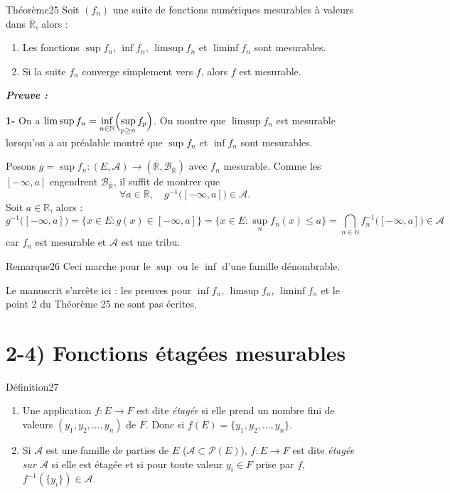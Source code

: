 \documentclass[11pt,a4paper]{article}
\newcommand{\R}{\mathbb{R}}
\newcommand{\N}{\mathbb{N}}
\newcommand{\Rb}{\overline{\mathbb{R}}}
\newcommand{\A}{\mathscr{A}}
\newcommand{\B}{\mathscr{B}}
\newcommand{\Pp}{\mathscr{P}}
\newenvironment{preuve}{\par\textit{\textbf{Preuve :}}\par\nopagebreak[4]}{\par}
\begin{document}
\begin{enonce}{Théorème}{25}
Soit $(f_n)$ une suite de fonctions numériques mesurables à valeurs dans $\Rb$, alors :
\begin{enumerate}[label=\textbf{\arabic*-},leftmargin=1.2cm]
  \item Les fonctions $\sup f_n$, $\inf f_n$, $\limsup f_n$ et $\liminf f_n$ sont mesurables.
  \item Si la suite $f_n$ converge simplement vers $f$, alors $f$ est mesurable.
\end{enumerate}
\end{enonce}

\begin{preuve}\end{preuve}

\textbf{1-} On a $\displaystyle\limsup f_n=\inf_{n\in\N}\Bigl(\sup_{p\ge n}f_p\Bigr)$.
On montre que $\limsup f_n$ est mesurable lorsqu'on a au préalable montré que
$\sup f_n$ et $\inf f_n$ sont mesurables.

Posons $g=\sup f_n : (E,\A)\to(\Rb,\B_{\Rb})$ avec $f_n$ mesurable.
Comme les $[-\infty,a]$ engendrent $\B_{\Rb}$, il suffit de montrer que
\[
  \forall a\in\R,\quad g^{-1}\bigl([-\infty,a]\bigr)\in\A .
\]
Soit $a\in\R$, alors :
\[
  g^{-1}\bigl([-\infty,a]\bigr)=\bigl\{x\in E : g(x)\in[-\infty,a]\bigr\}
  =\bigl\{x\in E : \sup_n f_n(x)\le a\bigr\}
  =\bigcap_{n\in\N} f_n^{-1}\bigl([-\infty,a]\bigr)\in\A
\]
car $f_n$ est mesurable et $\A$ est une tribu.

\begin{enonce}{Remarque}{26}
Ceci marche pour le $\sup$ ou le $\inf$ d'une famille dénombrable.
\end{enonce}

\begin{note}
Le manuscrit s'arrête ici : les preuves pour $\inf f_n$, $\limsup f_n$, $\liminf f_n$
et le point 2 du Théorème 25 ne sont pas écrites.
\end{note}

\section*{2-4) Fonctions étagées mesurables}

\begin{enonce}{Définition}{27}
\begin{enumerate}[label=\textbf{\arabic*-},leftmargin=1.2cm]
  \item Une application $f:E\to F$ est dite \emph{étagée} si elle prend un nombre fini de valeurs
        $(y_1,y_2,\dots,y_n)$ de $F$. Donc si $f(E)=\{y_1,y_2,\dots,y_n\}$.
  \item Si $\A$ est une famille de parties de $E$ ($\A\subset\Pp(E)$), $f:E\to F$ est dite
        \emph{étagée sur $\A$} si elle est étagée et si pour toute valeur $y_i\in F$ prise par $f$,
        $f^{-1}(\{y_i\})\in\A$.
\end{enumerate}
\end{enonce}
\end{document}
